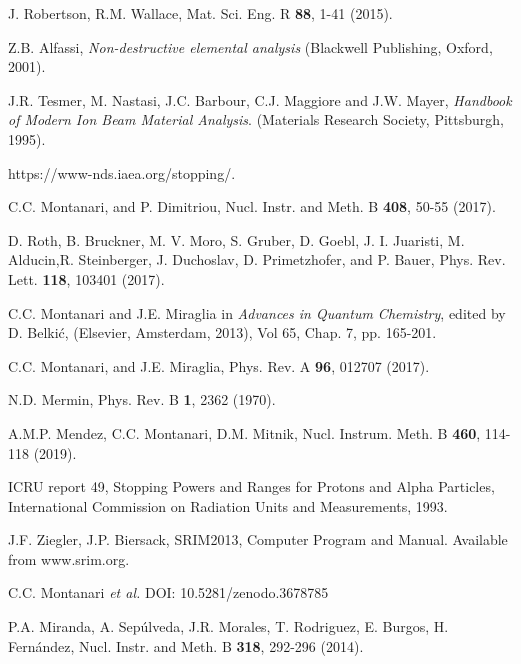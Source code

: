 \documentclass[aps,pra,reprint,groupedaddress,showpacs,showkeys]{revtex4-1}
\begin{document}
\begin{thebibliography}{00}
J. Robertson, R.M. Wallace, 
Mat. Sci. Eng. R \textbf{88}, 1-41 (2015).

Z.B. Alfassi,
\textit{Non-destructive elemental analysis}
(Blackwell Publishing, Oxford, 2001).

J.R. Tesmer, M. Nastasi, J.C. Barbour, C.J. Maggiore and J.W. Mayer,
\textit{Handbook of Modern Ion Beam Material Analysis}.
(Materials Research Society, Pittsburgh, 1995).

https://www-nds.iaea.org/stopping/.

C.C. Montanari, and P. Dimitriou, 
Nucl. Instr. and Meth. B \textbf{408},  50-55 (2017).

D. Roth, B. Bruckner, M. V. Moro, S. Gruber, D. Goebl, J. I. Juaristi, 
M. Alducin,R. Steinberger, J. Duchoslav, D. Primetzhofer, and P. Bauer, 
Phys. Rev. Lett. \textbf{118}, 103401 (2017).

C.C. Montanari and J.E. Miraglia in 
\textit{Advances in Quantum Chemistry}, 
edited by D. Belki\'c, (Elsevier, Amsterdam, 2013), Vol 65, Chap. 7, pp. 165-201. 

C.C. Montanari, and J.E. Miraglia, 
Phys. Rev. A \textbf{96}, 012707 (2017).

N.D. Mermin, 
Phys. Rev. B \textbf{1}, 2362 (1970).

A.M.P. Mendez, C.C. Montanari, D.M. Mitnik, 
Nucl. Instrum. Meth. B \textbf{460}, 114-118 (2019).

ICRU report 49, 
Stopping Powers and Ranges for Protons and Alpha Particles, 
International Commission on Radiation Units and Measurements, 1993.

J.F. Ziegler, J.P. Biersack, SRIM2013, 
Computer Program and Manual. Available from www.srim.org.

C.C. Montanari {\it et al.} DOI: 10.5281/zenodo.3678785 

 P.A. Miranda, A. Sep\'ulveda, J.R. Morales, 
T. Rodriguez, E. Burgos, H. Fern\'andez,
Nucl. Instr. and Meth. B \textbf{318}, 292-296  (2014).


\end{thebibliography}
\end{document}
